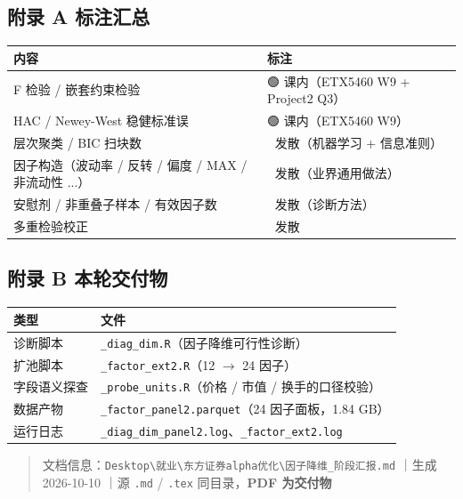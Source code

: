 \documentclass[11pt]{article}
\begin{document}
\subsection{\texorpdfstring{附录 A \textperiodcentered{} 标注汇总}{附录 A · 标注汇总}}
{\small
\begin{longtable}{p{9.68cm}p{6.52cm}}
\toprule
内容 & 标注 \\
\midrule
F 检验 / 嵌套约束检验 & 🟢 课内（ETX5460 W9 + Project2 Q3） \\
HAC / Newey-West 稳健标准误 & 🟢 课内（ETX5460 W9） \\
层次聚类 / BIC 扫块数 & 🔴 发散（机器学习 + 信息准则） \\
因子构造（波动率 / 反转 / 偏度 / MAX / 非流动性 ...） & 🔴 发散（业界通用做法） \\
安慰剂 / 非重叠子样本 / 有效因子数 & 🔴 发散（诊断方法） \\
多重检验校正 & 🔴 发散 \\
\bottomrule
\end{longtable}
}
\subsection{\texorpdfstring{附录 B \textperiodcentered{} 本轮交付物}{附录 B · 本轮交付物}}
{\small
\begin{longtable}{p{3.24cm}p{12.96cm}}
\toprule
类型 & 文件 \\
\midrule
诊断脚本 & \texttt{\_diag\_dim.R}（因子降维可行性诊断） \\
扩池脚本 & \texttt{\_factor\_ext2.R}（12 \ensuremath{\rightarrow} 24 因子） \\
字段语义探查 & \texttt{\_probe\_units.R}（价格 / 市值 / 换手的口径校验） \\
数据产物 & \texttt{\_factor\_panel2.parquet}（24 因子面板，1.84 GB） \\
运行日志 & \texttt{\_diag\_dim\_panel2.log}、\texttt{\_factor\_ext2.log} \\
\bottomrule
\end{longtable}
}
\begin{quote}
文档信息：\texttt{Desktop\textbackslash{}就业\textbackslash{}东方证券alpha优化\textbackslash{}因子降维\_阶段汇报.md} ｜生成 2026-10-10 ｜源 \texttt{.md} / \texttt{.tex} 同目录，\textbf{PDF 为交付物}
\end{quote}
\end{document}
